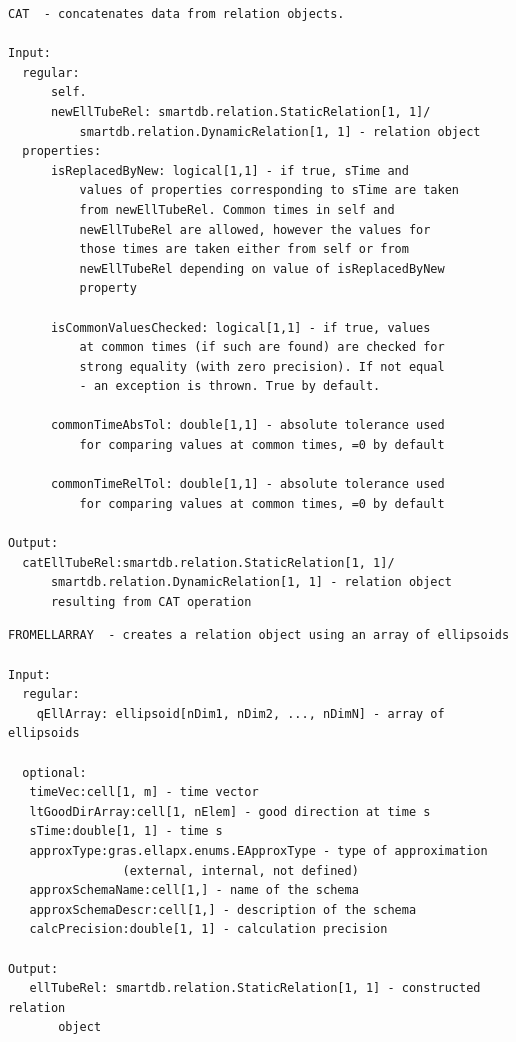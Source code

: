 \documentclass[letterpaper,10pt,english]{sphinxmanual}
\begin{document}
\begin{Verbatim}[commandchars=\\\{\}]
CAT  - concatenates data from relation objects.

Input:
  regular:
      self.
      newEllTubeRel: smartdb.relation.StaticRelation[1, 1]/
          smartdb.relation.DynamicRelation[1, 1] - relation object
  properties:
      isReplacedByNew: logical[1,1] - if true, sTime and
          values of properties corresponding to sTime are taken
          from newEllTubeRel. Common times in self and
          newEllTubeRel are allowed, however the values for
          those times are taken either from self or from
          newEllTubeRel depending on value of isReplacedByNew
          property

      isCommonValuesChecked: logical[1,1] - if true, values
          at common times (if such are found) are checked for
          strong equality (with zero precision). If not equal
          - an exception is thrown. True by default.

      commonTimeAbsTol: double[1,1] - absolute tolerance used
          for comparing values at common times, =0 by default

      commonTimeRelTol: double[1,1] - absolute tolerance used
          for comparing values at common times, =0 by default

Output:
  catEllTubeRel:smartdb.relation.StaticRelation[1, 1]/
      smartdb.relation.DynamicRelation[1, 1] - relation object
      resulting from CAT operation
\end{Verbatim}

\begin{Verbatim}[commandchars=\\\{\}]
FROMELLARRAY  - creates a relation object using an array of ellipsoids

Input:
  regular:
    qEllArray: ellipsoid[nDim1, nDim2, ..., nDimN] - array of ellipsoids

  optional:
   timeVec:cell[1, m] - time vector
   ltGoodDirArray:cell[1, nElem] - good direction at time s
   sTime:double[1, 1] - time s
   approxType:gras.ellapx.enums.EApproxType - type of approximation
                (external, internal, not defined)
   approxSchemaName:cell[1,] - name of the schema
   approxSchemaDescr:cell[1,] - description of the schema
   calcPrecision:double[1, 1] - calculation precision

Output:
   ellTubeRel: smartdb.relation.StaticRelation[1, 1] - constructed relation
       object
\end{Verbatim}
\end{document}
